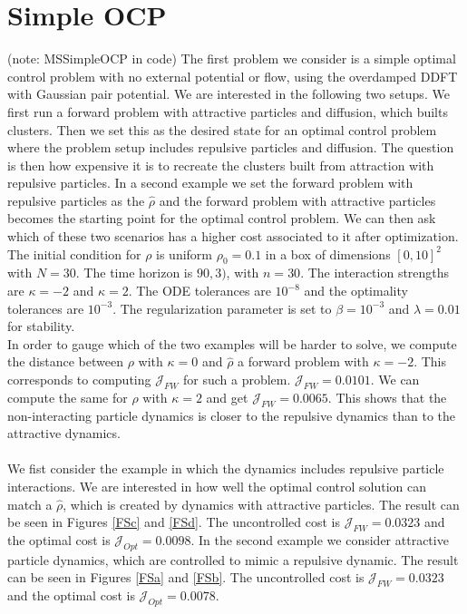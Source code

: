 \documentclass[11pt, a4paper]{article}
\theoremstyle{definition}
\newcommand{\hr}{\widehat \rho}
\begin{document}
\section{Simple OCP} \label{sec:SimpleOCP}
(note: MSSimpleOCP in code)
The first problem we consider is a simple optimal control problem with no external potential or flow, using the overdamped DDFT with Gaussian pair potential. We are interested in the following two setups. We first run a forward problem with attractive particles and diffusion, which builts clusters. Then we set this as the desired state for an optimal control problem where the problem setup includes repulsive particles and diffusion. The question is then how expensive it is to recreate the clusters built from attraction with repulsive particles. 
In a second example we set the forward problem with repulsive particles as the $\hr$ and the forward problem with attractive particles becomes the starting point for the optimal control problem.
We can then ask which of these two scenarios has a higher cost associated to it after optimization. 
The initial condition for $\rho$ is uniform $\rho_0 = 0.1$ in a box of dimensions $[0,10]^2$ with $N = 30$. The time horizon is $90,3)$, with $n = 30$. The interaction strengths are $\kappa = -2$ and $\kappa = 2$. The ODE tolerances are $10^{-8}$ and the optimality tolerances are $10^{-3}$. The regularization parameter is set to $\beta = 10^{-3}$ and $\lambda = 0.01$ for stability.
\\
In order to gauge which of the two examples will be harder to solve, we compute the distance between $\rho$ with $\kappa = 0$ and $\hr$ a forward problem with $\kappa = -2$. This corresponds to computing $\mathcal J_{FW}$ for such a problem. $\mathcal J_{FW}  = 0.0101$. We can compute the same for $\hr$ with $\kappa = 2$ and get $\mathcal J_{FW} = 0.0065$. This shows that the non-interacting particle dynamics is closer to the repulsive dynamics than to the attractive dynamics. 
\\
\\

We fist consider the example in which the dynamics includes repulsive particle interactions. We are interested in how well the optimal control solution can match a $\hr$, which is created by dynamics with attractive particles. The result can be seen in Figures \ref{FSc} and \ref{FSd}. The uncontrolled cost is $\mathcal J_{FW} = 0.0323$ and the optimal cost is $\mathcal J_{Opt} =  0.0098$. In the second example we consider attractive particle dynamics, which are controlled to mimic a repulsive dynamic. The result can be seen in Figures \ref{FSa} and \ref{FSb}. The uncontrolled cost is $\mathcal J_{FW} = 0.0323$ and the optimal cost is $\mathcal J_{Opt} =  0.0078$.
	
\end{document}
